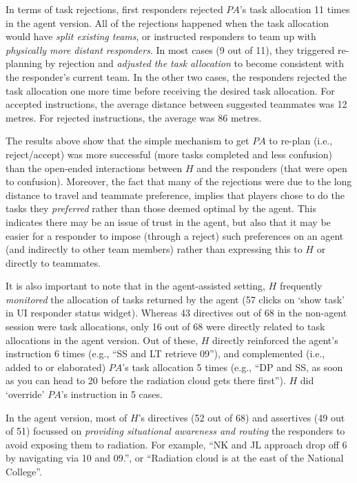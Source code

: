 In terms of task rejections, first responders rejected $PA$'s task allocation 11 times in the agent version. All of the rejections happened when the task allocation would have \emph{split existing teams}, or instructed responders to team up with \emph{physically more distant responders}. In most cases (9 out of 11), they triggered re-planning by rejection and \emph{adjusted the task allocation} to become consistent with the responder's current team. In the other two cases, the responders rejected  the task allocation one more time before receiving the desired task allocation. For accepted instructions, the average distance between suggested teammates was 12 metres. For rejected instructions, the average was 86 metres.

The results above show that  the simple mechanism to get $PA$ to re-plan (i.e., reject/accept) was more successful (more tasks completed and less confusion) than the open-ended interactions between $H$ and the responders (that were open to confusion).  Moreover, the fact that many of the rejections were due to the long distance to travel and teammate preference, implies that players chose to do the tasks they \emph{preferred}  rather than those deemed optimal by the agent. This indicates there may be an issue of trust in the agent, but also that it may be easier for a responder  to impose (through a reject) such preferences on an agent (and indirectly to other team members) rather than expressing this to $H$ or directly to teammates. 

It is also important to note that in the agent-assisted setting, $H$ frequently \emph{monitored} the allocation of tasks  returned by the agent (57 clicks on `show task' in UI responder status widget). Whereas 43 directives out of 68 in the non-agent session were task allocations, only 16 out of 68 were directly related to task allocations in the agent version. Out of these, $H$ directly reinforced the agent's instruction 6 times (e.g., ``SS and LT retrieve 09''), and complemented (i.e., added to or elaborated) $PA$'s task allocation 5 times (e.g., ``DP and SS, as soon as you can head to 20 before the radiation cloud gets there first''). $H$  did `override' $PA$'s instruction in 5 cases.  

In the agent version, most of $H$'s directives (52 out of 68) and assertives (49 out of 51) focussed on \textit{providing situational awareness and routing} the responders to avoid exposing them to radiation. For example, ``NK and JL approach drop off 6 by navigating via 10 and 09.'', or ``Radiation cloud is at the east of the National College''. 

